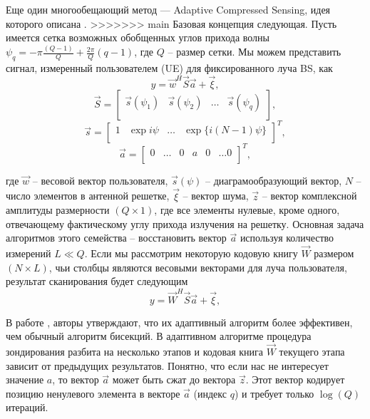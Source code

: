 Еще один многообещающий метод —  Adaptive Compressed Sensing, идея которого описана \cite{Alkhateeb2014}.
>>>>>>> main
Базовая концепция следующая. Пусть имеется сетка возможных
обобщенных углов прихода волны $\psi_q = - \pi\frac{(Q-1)}{Q} + \frac{2\pi}{Q} (q-1)$, где $Q$ -- размер сетки.
Мы можем представить сигнал, измеренный пользователем (UE) для фиксированного
луча BS, как
\begin{equation}
    \label{eq:4.42}
    y = \vec w^H\vec S \vec a + \vec \xi,
\end{equation}
\begin{equation}
    \label{eq:4.43}
    \vec S =
    \begin{bmatrix}
        \vec s(\psi_1) & \vec s(\psi_2) & \dots & \vec s(\psi_q) \\
    \end{bmatrix},
\end{equation}
\begin{equation}
    \label{eq:4.44}
    \vec s =
    \begin{bmatrix}
        1 & \exp{i\psi} & \dots & \exp\{ i(N-1)\psi\} \\
    \end{bmatrix}^T,
\end{equation}
\begin{equation}
    \label{eq:4.45}
    \vec a =
    \begin{bmatrix}
        0 & \dots & 0 & a & 0 & \dots 0 \\
    \end{bmatrix}^T,
\end{equation}

где $\vec w$ -- весовой вектор пользователя,
$\vec s(\psi)$ -- диаграмообразующий вектор,
$N$ -- число элементов в антенной решетке,
$\vec \xi$ -- вектор шума,
$\vec z$ -- вектор комплексной амплитуды размерности $(Q\times 1)$,
где все элементы нулевые, кроме одного, отвечающему фактическому углу
прихода излучения на решетку.
Основная задача алгоритмов этого семейства -- восстановить вектор $\vec a$
используя количество измерений $L \ll Q$.  Если мы рассмотрим некоторую кодовую
книгу $\vec W$ размером $(N \times L)$, чьи столбцы являются весовыми векторами
для луча пользователя, результат сканирования будет
следующим
\begin{equation}
    \label{eq:4.46}
    y = \vec W^H\vec S \vec a + \vec \xi,
\end{equation}

В работе \cite{Alkhateeb2014}, авторы утверждают, что их адаптивный алгоритм более эффективен,
чем обычный алгоритм бисекций. В адаптивном алгоритме процедура зондирования разбита на несколько этапов
и кодовая книга $\vec W$ текущего этапа зависит от предыдущих результатов. Понятно, что если нас не интересует значение $a$, то
вектор $\vec a$ может быть сжат до вектора $\vec z$. Этот вектор кодирует позицию ненулевого элемента в векторе $\vec a$ (индекс $q$) и
требует только $\log(Q)$ итераций.

